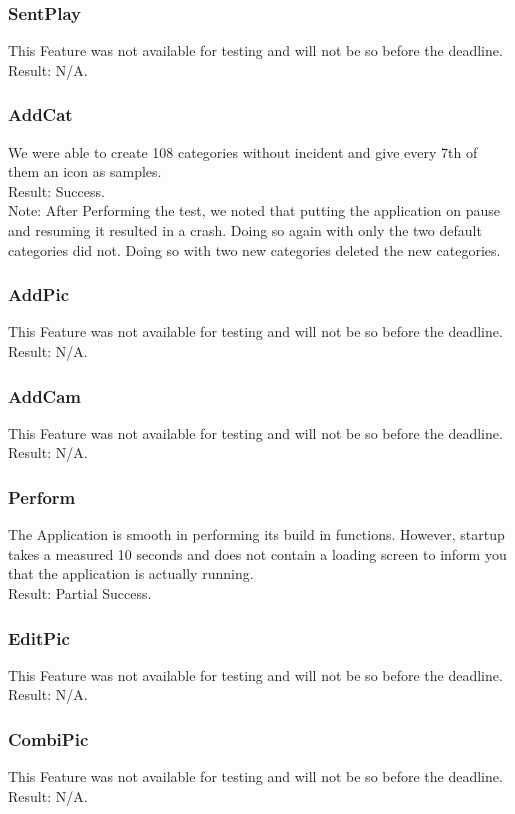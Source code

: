 \subsubsection*{SentPlay}
This Feature was not available for testing and will not be so before the deadline.\\

Result: N/A.

\subsubsection*{AddCat}
We were able to create 108 categories without incident and give every 7th of them an icon as samples.\\

Result: Success.\\

Note: After Performing the test, we noted that putting the application on pause and resuming it resulted in a crash. Doing so again with only the two default categories did not. Doing so with two new categories deleted the new categories.

\subsubsection*{AddPic}
This Feature was not available for testing and will not be so before the deadline.\\

Result: N/A.

\subsubsection*{AddCam}
This Feature was not available for testing and will not be so before the deadline.\\

Result: N/A.

\subsubsection*{Perform}
The Application is smooth in performing its build in functions.
However, startup takes a measured  10 seconds and does not contain a loading screen to inform you that the application is actually running.\\

Result: Partial Success.

\subsubsection*{EditPic}
This Feature was not available for testing and will not be so before the deadline.\\

Result: N/A.

\subsubsection*{CombiPic}
This Feature was not available for testing and will not be so before the deadline.\\

Result: N/A.